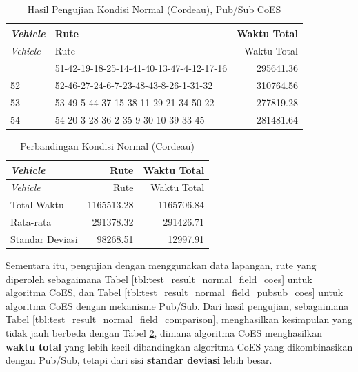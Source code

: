 \begin{longtable}[h]{lp{8cm}r}
	\caption{Hasil Pengujian Kondisi Normal (Cordeau), Pub/Sub CoES}
	\label{tbl:test_result_normal_cordeau_pubsub_coes}\\
	\toprule
		\textit{Vehicle} & Rute & Waktu Total\\ 
	\midrule
	\endfirsthead
	\toprule
		\textit{Vehicle} & Rute & Waktu Total\\ 
	\midrule
	\endhead
	\bottomrule
	\endfoot
		51 & 51-42-19-18-25-14-41-40-13-47-4-12-17-16 & 295641.36 \\
		52 & 52-46-27-24-6-7-23-48-43-8-26-1-31-32 & 310764.56 \\
		53 & 53-49-5-44-37-15-38-11-29-21-34-50-22 & 277819.28 \\
		54 & 54-20-3-28-36-2-35-9-30-10-39-33-45 & 281481.64 \\
\end{longtable}


\begin{longtable}[h]{lrr}
	\caption{Perbandingan Kondisi Normal (Cordeau)}
	\label{tbl:test_result_normal_cordeau_comparison}\\
	\toprule
		\textit{Vehicle} & Rute & Waktu Total\\ 
	\midrule
	\endfirsthead
	\toprule
		\textit{Vehicle} & Rute & Waktu Total\\ 
	\midrule
	\endhead
	\bottomrule
	\endfoot
		Total Waktu & 1165513.28 & 1165706.84\\
		Rata-rata & 291378.32 & 291426.71\\
		Standar Deviasi & 98268.51 & 12997.91\\
\end{longtable}


Sementara itu, pengujian dengan menggunakan data lapangan, rute yang diperoleh sebagaimana Tabel \ref{tbl:test_result_normal_field_coes} untuk algoritma CoES, dan Tabel \ref{tbl:test_result_normal_field_pubsub_coes} untuk algoritma CoES dengan mekanisme Pub/Sub. Dari hasil pengujian, sebagaimana Tabel \ref{tbl:test_result_normal_field_comparison}, menghasilkan kesimpulan yang tidak jauh berbeda dengan Tabel \ref{tbl:test_result_normal_cordeau_comparison}, dimana algoritma CoES menghasilkan \textbf{waktu total} yang lebih kecil dibandingkan algoritma CoES yang dikombinasikan dengan Pub/Sub, tetapi dari sisi \textbf{standar deviasi} lebih besar.


